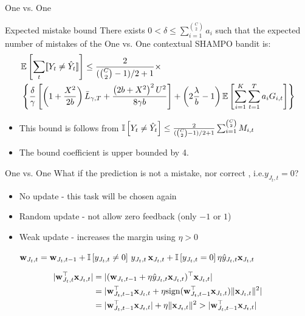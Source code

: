 \documentclass{beamer}
\begin{document}
\begin{frame}{One vs. One}
\begin{block}{Expected mistake bound}
There exists $0<\delta\le \sum_{i=1}^{C \choose 2}a_{i}$ such that the  expected number of mistakes  of the One vs. One contextual SHAMPO bandit  is:
 \[
 \begin{split}
 &\mathbb{E}\left[{\sum_t [\![{Y_t \neq \hat{Y}_t}]\!]}\right]\le \frac{2}{({C \choose 2}-1)/2+1}\times\\
 &\left\{{ \frac{\delta}{\gamma}\left[{\left({1+\frac{X^2}{2b} }\right){\bar L}_{\gamma,T}+\frac{\left({{2b+X^2}}\right)^2U^{2}}{8{\gamma}b}}\right]+\left({2\frac{\lambda}{b}-1}\right)\mathbb{E}\left[{\sum_{i=1}^{K}\sum_{t=1}^{T}{a_{i}G_{i,t}}}\right]}\right\}
 \end{split}
 \]
\end{block}
\begin{itemize}

\item This bound is follows from $\mathbb{I}\left[{Y_t \neq \hat{Y}_t}\right] \leq \frac{2}{({C \choose 2}-1)/2+1}\sum_{i=1}^{ {C \choose 2}} M_{i,t}$\newline [Allwein et al., 2000]\newline
\item The bound coefficient is upper bounded by 4.
\end{itemize}
\end{frame}

\begin{frame}{One vs. One}
What if the prediction is not a mistake, nor correct , i.e.$y_{J_t,t}=0$?\newline
\begin{itemize}
\item No update -  this task will be chosen again\newline
\item Random update - not allow zero feedback (only $-1$ or $1$)\newline
\item Weak update - increases the margin using $\eta>0$\newline

$
\mathbf{w}_{J_t,t} = \mathbf{w}_{J_t,t-1}+ \mathbb{I}\left[{y_{J_t,t}\ne0}\right] \, y_{J_t,t}\, \mathbf{x}_{J_t,t} +
 \mathbb{I}\left[{y_{J_t,t}=0}\right] \eta \hat{y}_{J_t,t}\mathbf{x}_{J_t,t}~$
\newline
\end{itemize}
\begin{equation*}
\begin {aligned}
\vert {\mathbf{w}}^{\top}_{J_t,t} \mathbf{x}_{J_t,t} \vert &= \vert
(\mathbf{w}_{J_t,t-1}+ \eta \hat{y}_{J_t,t}\mathbf{x}_{J_t,t})^\top\mathbf{x}_{J_t,t}\vert \\
&= \vert {\mathbf{w}}^{\top}_{J_t,t-1}\mathbf{x}_{J_t,t}+ \eta {\rm sign}({\mathbf{w}}^{\top}_{J_t,t-1}\mathbf{x}_{J_t,t}) \Vert\mathbf{x}_{J_t,t}\Vert^2 \vert \\
&= \vert {\mathbf{w}}^{\top}_{J_t,t-1}\mathbf{x}_{J_t,t}\vert + \eta \Vert\mathbf{x}_{J_t,t}\Vert^2 > \vert {\mathbf{w}}^{\top}_{J_t,t-1}\mathbf{x}_{J_t,t}\vert
\end{aligned}
\end{equation*}
\end{frame}
\end{document}
